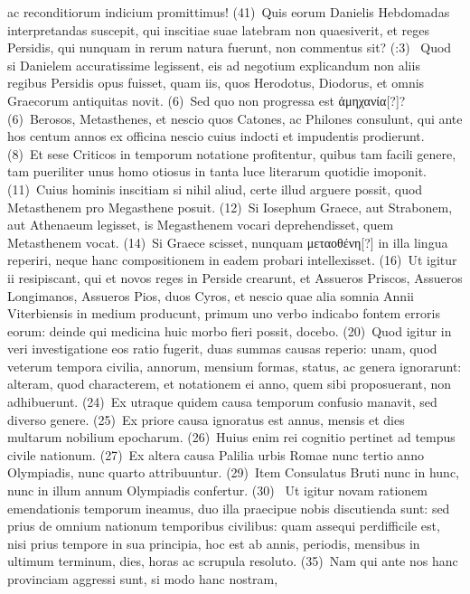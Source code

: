 \documentclass[draft,12pt,twoside,a4paper]{book}
\newcounter{sourcepagenr}
\newcounter{pdfpagenr}
\newcommand{\lnr}[1]{\nrfont({#1})~\normalfont}
\newcommand{\plnr}[3]{%
	\setcounter{pdfpagenr}{{#1}}%
	\setcounter{sourcepagenr}{{#2}}%
	\nrfont(\arabic{sourcepagenr}:{{#3}})~\normalfont%
}
\begin{document}
ac reconditiorum indicium promittimus!
\lnr{41}Quis eorum Danielis
Hebdomadas interpretandas suscepit, qui inscitiae suae latebram
non quaesiverit, et reges Persidis, qui nunquam in rerum natura fuerunt,
non commentus sit?
%
\plnr{86}{3}{3}Quod si Danielem accuratissime legissent,
eis ad negotium explicandum non aliis regibus Persidis opus fuisset,
quam iis, quos Herodotus, Diodorus, et omnis Graecorum antiquitas
novit.
\lnr{6}Sed quo non progressa est \textgreek{ἀμηχανία[?]}?
\lnr{6}Berosos, Metasthenes, et
nescio quos Catones, ac Philones consulunt, qui ante hos centum annos
ex officina nescio cuius indocti et impudentis prodierunt.
\lnr{8}Et sese
Criticos in temporum notatione profitentur, quibus tam facili genere,
tam pueriliter unus homo otiosus in tanta luce literarum quotidie imoponit.
\lnr{11}Cuius hominis inscitiam si nihil aliud, certe illud arguere
 possit, quod
Metasthenem pro Megasthene posuit.
\lnr{12}Si Iosephum Graece, aut Strabonem,
aut Athenaeum legisset, is Megasthenem vocari deprehendisset,
quem Metasthenem vocat.
\lnr{14}Si Graece scisset, nunquam \textgreek{μεταοθένη[?]} in illa
lingua reperiri, neque hanc compositionem in eadem probari intellexisset.
\lnr{16}Ut igitur ii resipiscant, qui et novos reges in Perside crearunt,
et Assueros Priscos, Assueros Longimanos, Assueros Pios, duos Cyros,
et nescio quae alia somnia Annii Viterbiensis in medium producunt,
primum uno verbo indicabo fontem erroris eorum: deinde qui medicina
huic morbo fieri possit, docebo.
\lnr{20}Quod igitur in veri investigatione
eos ratio fugerit, duas summas causas reperio: unam, quod veterum
tempora civilia, annorum, mensium formas, status, ac genera ignorarunt:
alteram, quod characterem, et notationem ei anno, quem sibi
proposuerant, non adhibuerunt.
\lnr{24}Ex utraque quidem causa temporum
confusio manavit, sed diverso genere.
\lnr{25}Ex priore causa ignoratus est
annus, mensis et dies multarum nobilium epocharum.
\lnr{26}Huius enim
rei cognitio pertinet ad tempus civile nationum.
\lnr{27}Ex altera causa Palilia
urbis Romae nunc tertio anno Olympiadis, nunc quarto attribuuntur.
\lnr{29}Item Consulatus Bruti nunc in hunc, nunc in illum annum
Olympiadis confertur.
\lnr{30}
Ut igitur novam rationem emendationis temporum
ineamus, duo illa praecipue nobis discutienda sunt: sed prius
de omnium nationum temporibus civilibus: quam assequi perdifficile
est, nisi prius tempore in sua principia, hoc est ab annis, periodis,
mensibus in ultimum terminum, dies, horas ac scrupula resoluto.
\lnr{35}Nam qui ante nos hanc provinciam aggressi sunt, si modo hanc nostram,
\end{document}
